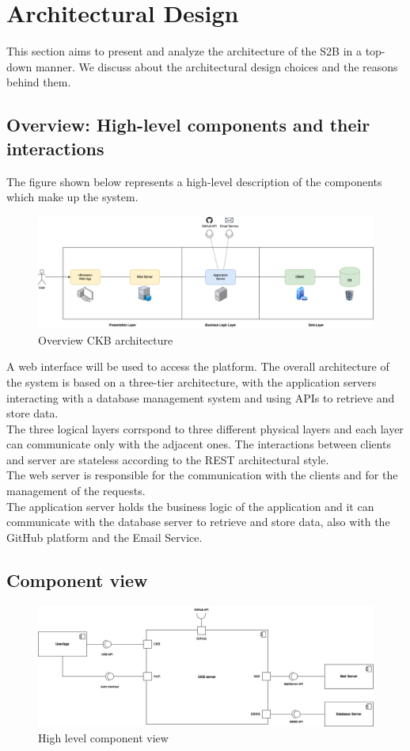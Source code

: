 \chapter{Architectural Design}
This section aims to present and analyze the architecture of the S2B in a top-down manner. 
We discuss about the architectural design choices and the reasons behind them. 

\section{Overview: High-level components and their interactions}
The figure shown below represents a high-level description of the components which make up the system.
\begin{figure}[H]
    \centering
    \includegraphics[width=\textwidth]{images/component_view/high_level.png}
    \caption{Overview CKB architecture}
    \label{fig:CKB Architecture}
\end{figure}
A web interface will be used to access the platform. 
The overall architecture of the system is based on a three-tier architecture, 
with the application servers interacting with a database management system and
using APIs to retrieve and store data. \\
The three logical layers corrspond to three different physical layers and each layer can communicate only with the adjacent ones.
The interactions between clients and server are stateless according to the REST architectural style. \\
The web server is responsible for the communication with the clients and for the management of the requests. \\
The application server holds the business logic of the application and it can communicate with the database server to retrieve and store data, also with the GitHub platform and the Email Service. 

\section{Component view}
\begin{figure}[H]
    \centering
    \includegraphics[width=\textwidth]{images/component_view/Component_view.png}
    \caption{High level component view}
\end{figure}


